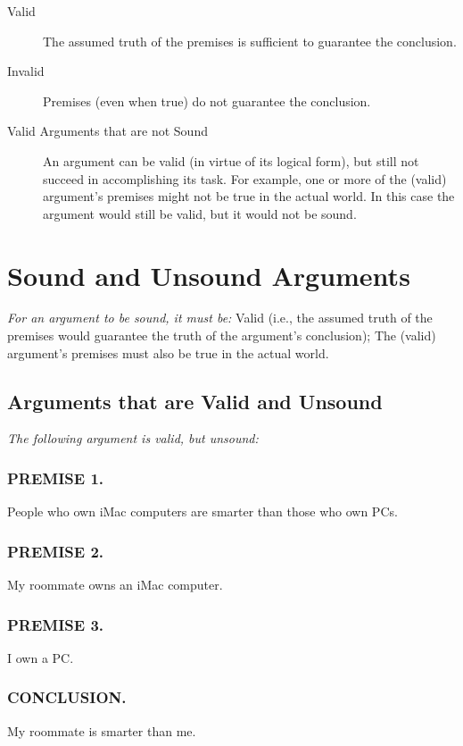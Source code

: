 \documentclass{article}
\begin{document}
\begin{description}

  \item [Valid] The assumed truth of the premises is sufficient to guarantee the conclusion.

  \item [Invalid] Premises (even when true) do not guarantee the conclusion.

  \item [Valid Arguments that are not Sound] An argument can be valid (in virtue of its logical form), but still not succeed in accomplishing its task.
For example, one or more of the (valid) argument’s premises might not be true in the actual world.
In this case the argument would still be valid, but it would not be sound.

\end{description}

    \section{Sound and Unsound Arguments}

\textit{For an argument to be sound, it must be:}
Valid (i.e., the assumed truth of the premises would guarantee the truth of the argument’s conclusion);
The (valid) argument’s premises must also be true in the actual world.


\subsection{Arguments that are Valid and Unsound}

\textit{The following argument is valid, but unsound:}

\subsubsection{PREMISE 1.}
People who own iMac computers are smarter than those who own PCs.

\subsubsection{PREMISE 2.}
My roommate owns an iMac computer.

\subsubsection{PREMISE 3.}
I own a PC.

\subsubsection{CONCLUSION.}
My roommate is smarter than me.
\end{document}
